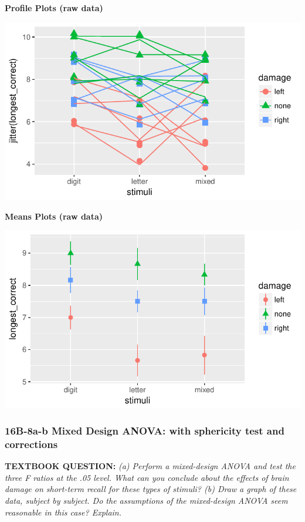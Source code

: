 \documentclass[]{article}
\begin{document}
\textbf{Profile Plots (raw data)}

\begin{center}\includegraphics{Unit_5_assignment_KEY_R__spr18__files/figure-latex/unnamed-chunk-71-1} \end{center}

\textbf{Means Plots (raw data)}

\begin{center}\includegraphics{Unit_5_assignment_KEY_R__spr18__files/figure-latex/unnamed-chunk-72-1} \end{center}

\clearpage

\subsubsection{16B-8a-b Mixed Design ANOVA: with sphericity test and
corrections}\label{b-8a-b-mixed-design-anova-with-sphericity-test-and-corrections}

\textbf{TEXTBOOK QUESTION:} \emph{(a) Perform a mixed-design ANOVA and
test the three F ratios at the .05 level. What can you conclude about
the effects of brain damage on short-term recall for these types of
stimuli? (b) Draw a graph of these data, subject by subject. Do the
assumptions of the mixed-design ANOVA seem reasonable in this case?
Explain. }
\end{document}
